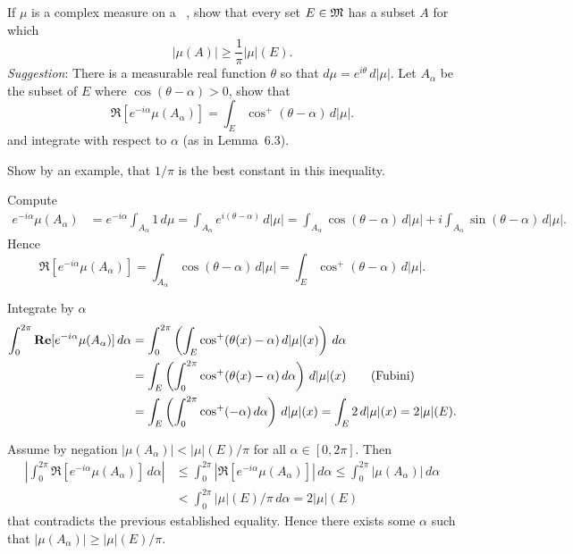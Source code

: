 \begin{enumerate}
\begin{excopy}
If \(\mu\) is a complex measure on a \salgebra\ \frakM, show that every 
set \(E\in\frakM\) has a subset $A$ for which 
\begin{equation*}
|\mu(A)| \geq \frac{1}{\pi} |\mu|(E).
\end{equation*}
\emph{Suggestion}: There is a measurable real function \(\theta\) so that
\(d\mu = e^{i\theta}\,d|\mu|\).
Let \(A_\alpha\) be the subset of $E$ where \(\cos(\theta - \alpha)>0\), 
show that
\begin{equation*}
\Re[e^{-i\alpha}\mu(A_\alpha)] = \int_E \cos^+(\theta - \alpha)\,d|\mu|.
\end{equation*}
and integrate with respect to \(\alpha\) (as in Lemma~6.3).

Show by an example, that \(1/\pi\) is the best constant in this inequality.
\end{excopy}

Compute
\begin{align*}
e^{-i\alpha} \mu(A_\alpha)
&= e^{-i\alpha}\int_{A_\alpha} 1\,d\mu
 = \int_{A_\alpha} e^{i(\theta - \alpha)}\,d|\mu|
 = \int_{A_\alpha} \cos(\theta-\alpha)\,d|\mu| 
   + i\int_{A_\alpha} \sin(\theta - \alpha)\,d|\mu|.
\end{align*}
Hence
\begin{equation*}
\Re[e^{-i\alpha}\mu(A_\alpha)]
= \int_{A_\alpha} \cos(\theta-\alpha)\,d|\mu| 
= \int_E \cos^+(\theta-\alpha)\,d|\mu|.
\end{equation*}

Integrate by \(\alpha\)
\begin{align*}
\int_0^{2\pi} \Re[e^{-i\alpha}\mu(A_\alpha)]\,d\alpha
&= \int_0^{2\pi} 
   \left(\int_E \cos^+(\theta(x)-\alpha)\,d|\mu|(x)\right)\,d\alpha  \\
&= \int_E \left(
      \int_0^{2\pi} \cos^+(\theta(x)-\alpha)\,d\alpha
          \right)\,d|\mu|(x)  \qquad\textnormal{(Fubini)} \\
&= \int_E \left(
      \int_0^{2\pi} \cos^+(-\alpha)\,d\alpha \right)\,d|\mu|(x) 
 = \int_E 2\,d|\mu|(x) 
 = 2|\mu|(E).
\end{align*}

Assume by negation
\(|\mu(A_\alpha)| <  |\mu|(E)/\pi\) 
for all \(\alpha\in[0,2\pi]\). Then
\begin{align*}
\left|\int_0^{2\pi} \Re[e^{-i\alpha}\mu(A_\alpha)]\,d\alpha\right|
&\leq \int_0^{2\pi} \left|\Re[e^{-i\alpha}\mu(A_\alpha)]\right|\,d\alpha
 \leq \int_0^{2\pi} |\mu(A_\alpha)|\,d\alpha \\
&< \int_0^{2\pi} |\mu|(E)/\pi\,d\alpha
  = 2|\mu|(E)
\end{align*}
that contradicts the previous established equality.
Hence there exists some \(\alpha\)
such that \(|\mu(A_\alpha)| \geq |\mu|(E)/\pi\).


\end{enumerate}
